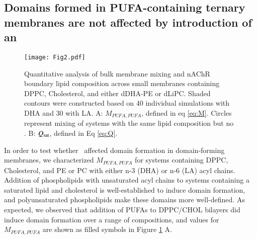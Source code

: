 

\subsection {Domains formed in PUFA-containing ternary membranes are not affected by introduction of an \nachr } \label{Demix}
	\begin{figure}[h!]
		\center
		\texttt{[image: Fig2.pdf]}
		\caption{Quantitative analysis of bulk membrane mixing and nAChR boundary lipid composition across small membranes containing DPPC, Cholesterol, and either dDHA-PE or dLiPC. Shaded contours were constructed based on 40 individual simulations with DHA and 30 with LA. A: $M_{PUFA, PUFA}$, defined in eq \ref{eq:M}.  Circles represent mixing of systems with the same lipid composition but no \nachr. B: $Q_{\mathrm{sat}}$, defined in Eq \ref{eq:Q}.   }
		\label{fig:fig2}
	\end{figure} 
	
	In order to test whether \nachr~affected domain formation in domain-forming membranes, we characterized $M_{{PUFA,PUFA}}$ for systems containing DPPC, Cholesterol, and PE or PC with either n-3 (DHA) or n-6 (LA) acyl chains.   Addition of phospholipids with unsaturated acyl chains to systems containing a saturated lipid and cholesterol is well-established to induce domain formation, and polyunsaturated phospholipids make these domains more well-defined\cite{Levental_Polyunsaturated_2016}. As expected, we observed that addition of PUFAs to DPPC/CHOL bilayers did induce domain formation over a range of compositions, and values for $M_{{PUFA,PUFA}}$ are shown as filled symbols in Figure \ref{fig:fig2} A. 
	
